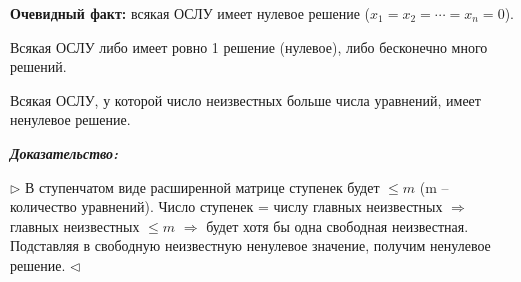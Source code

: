 \bigskip
\textbf{Очевидный факт:} всякая ОСЛУ имеет нулевое решение ($x_1 = x_2 = \cdots= x_n = 0$).

\begin{corollary}
Всякая ОСЛУ либо имеет ровно 1 решение (нулевое), либо бесконечно много решений.
\end{corollary}

\begin{corollary}
Всякая ОСЛУ, у которой число неизвестных больше числа уравнений, имеет ненулевое решение.
\end{corollary}

\textbf{\textit{Доказательство:}} 

$\rhd$ В ступенчатом виде расширенной матрице ступенек будет $\le m$ (m -- количество уравнений). Число ступенек = числу главных неизвестных $\Rightarrow$ главных неизвестных $\le m$ $\Rightarrow$ будет хотя бы одна свободная неизвестная. Подставляя в свободную неизвестную ненулевое значение, получим ненулевое решение. $\lhd$

